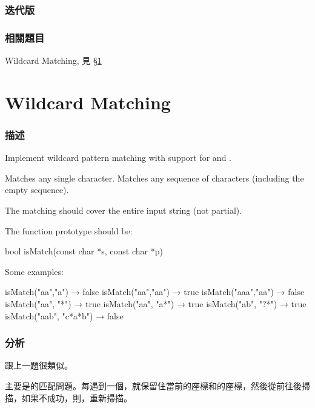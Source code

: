 \subsubsection{迭代版}
\begin{Code}

\end{Code}


\subsubsection{相關題目}
\begindot
\item Wildcard Matching, 見 \S \ref{sec:wildcard-matching}
\myenddot


\section{Wildcard Matching} %
\label{sec:wildcard-matching}


\subsubsection{描述}
Implement wildcard pattern matching with support for  and .

 Matches any single character.
 Matches any sequence of characters (including the empty sequence).

The matching should cover the entire input string (not partial).

The function prototype should be:
\begin{Code}
bool isMatch(const char *s, const char *p)
\end{Code}

Some examples:
\begin{Code}
isMatch("aa","a") → false
isMatch("aa","aa") → true
isMatch("aaa","aa") → false
isMatch("aa", "*") → true
isMatch("aa", "a*") → true
isMatch("ab", "?*") → true
isMatch("aab", "c*a*b") → false
\end{Code}


\subsubsection{分析}
跟上一題很類似。

主要是的匹配問題。每遇到一個，就保留住當前的座標和的座標，然後從前往後掃描，如果不成功，則，重新掃描。


